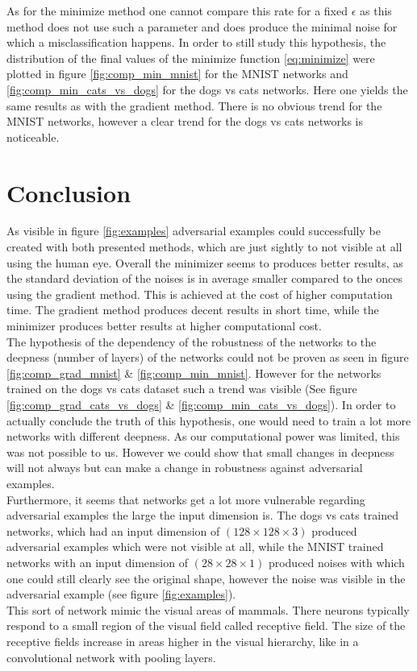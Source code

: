 \documentclass[%
 reprint,
 amsmath,amssymb,
 aps,
]{revtex4-1}
\begin{document}
As for the minimize method one cannot compare this rate for a fixed $\epsilon$ as this method does not use such a parameter and does produce the minimal noise for which a misclassification happens. In order to still study this hypothesis, the distribution of the final values of the minimize function \eqref{eq:minimize} were plotted in figure \ref{fig:comp_min_mnist} for the MNIST networks and \ref{fig:comp_min_cats_vs_dogs} for the dogs vs cats networks. Here one yields the same results as with the gradient method. There is no obvious trend for the MNIST networks, however a clear trend for the dogs vs cats networks is noticeable.\\

\section{Conclusion}

As visible in figure \ref{fig:examples} adversarial examples could successfully be created with both presented methods, which are just sightly to not visible at all using the human eye. Overall the minimizer seems to produces better results, as the standard deviation of the noises is in average smaller compared to the onces using the gradient method. This is achieved at the cost of higher computation time. The gradient method produces decent results in short time, while the minimizer produces better results at higher computational cost. \\
The hypothesis of the dependency of the robustness of the networks to the deepness (number of layers) of the networks could not be proven as seen in figure \ref{fig:comp_grad_mnist} \& \ref{fig:comp_min_mnist}. However for the networks trained on the dogs vs cats dataset such a trend was visible (See figure \ref{fig:comp_grad_cats_vs_dogs} \& \ref{fig:comp_min_cats_vs_dogs}). In order to actually conclude the truth of this hypothesis, one would need to train a lot more networks with different deepness. As our computational power was limited, this was not possible to us. However we could show that small changes in deepness will not always but can make a change in robustness against adversarial examples.\\
Furthermore, it seems that networks get a lot more vulnerable regarding adversarial examples the large the input dimension is. The dogs vs cats trained networks, which had an input dimension of $(128 \times 128 \times 3)$ produced adversarial examples which were not visible at all, while the MNIST trained networks with an input dimension of $(28 \times 28 \times 1)$ produced noises with which one could still clearly see the original shape, however the noise was visible in the adversarial example (see figure \ref{fig:examples}).\\
This sort of network mimic the visual areas of mammals. There neurons typically respond to a small region of the visual field called receptive field. The size of the receptive fields increase in areas higher in the visual hierarchy, like in a convolutional network with pooling layers.
\end{document}
